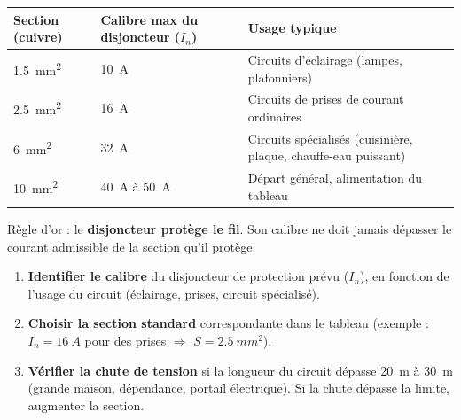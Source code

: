 \documentclass[11pt]{article}
\begin{document}
\begin{aretenir}
\begin{center}
\begin{tabularx}{\linewidth}{|l|l|X|}\hline
\rowcolor{popblueL} \textbf{Section (cuivre)} & \textbf{Calibre max du disjoncteur ($I_n$)} & \textbf{Usage typique} \\ \hline
\SI{1,5}{mm^2} & \SI{10}{A} & Circuits d'éclairage (lampes, plafonniers) \\ \hline
\SI{2,5}{mm^2} & \SI{16}{A} & Circuits de prises de courant ordinaires \\ \hline
\SI{6}{mm^2} & \SI{32}{A} & Circuits spécialisés (cuisinière, plaque, chauffe-eau puissant) \\ \hline
\SI{10}{mm^2} & \SI{40}{A} à \SI{50}{A} & Départ général, alimentation du tableau \\ \hline
\end{tabularx}
\end{center}
Règle d'or : le \textbf{disjoncteur protège le fil}. Son calibre ne doit jamais dépasser le courant admissible de la section qu'il protège.
\end{aretenir}

\begin{methode}
\begin{enumerate}
\item \textbf{Identifier le calibre} du disjoncteur de protection prévu ($I_n$), en fonction de l'usage du circuit (éclairage, prises, circuit spécialisé).
\item \textbf{Choisir la section standard} correspondante dans le tableau (exemple : $I_n = \SI{16}{A}$ pour des prises $\Rightarrow$ $S = \SI{2,5}{mm^2}$).
\item \textbf{Vérifier la chute de tension} si la longueur du circuit dépasse \SI{20}{m} à \SI{30}{m} (grande maison, dépendance, portail électrique). Si la chute dépasse la limite, augmenter la section.
\end{enumerate}
\end{methode}
\end{document}
